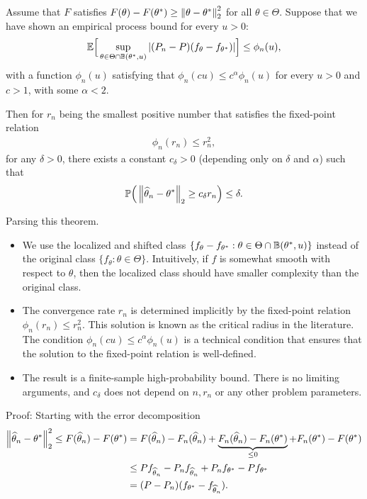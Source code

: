 \documentclass[11pt,letterpaper]{article}
\numberwithin{theorem}{lecture}
\numberwithin{proposition}{lecture}
\numberwithin{lemma}{lecture}
\numberwithin{claim}{lecture}
\numberwithin{corollary}{lecture}
\numberwithin{definition}{lecture}
\numberwithin{conjecture}{lecture}
\numberwithin{remark}{lecture}
\numberwithin{example}{lecture}
\numberwithin{equation}{lecture}
\begin{document}
\begin{theorem}[Localization]
  Assume that $F$ satisfies $F(\theta) - F ({\theta^*}) \geq \left\| \theta - {\theta^*}\right\|_{2}^2$ for all $\theta \in \Theta$. Suppose that we have shown an empirical process bound for every $u > 0$:
  \begin{align}
    {\mathbb{E}} \Big[ \sup_{\theta \in \Theta \cap \mathbb{B} ({\theta^*}, u)} |(P_n - P) (f_\theta - f_{{\theta^*}})| \Big] \leq \phi_n (u),
  \end{align}
  with a function $\phi_n (u)$ satisfying that $\phi_n (c u) \leq c^\alpha \phi_n (u)$ for every $u > 0$ and $c > 1$, with some $\alpha < 2$.

  Then for $r_n$ being the smallest positive number that satisfies the fixed-point relation
  \begin{align}
    \phi_n (r_n) \leq r_n^2,
  \end{align}
  for any $\delta > 0$, there exists a constant $c_\delta > 0$ (depending only on $\delta$ and $\alpha$) such that
  \begin{align}
    {\mathbb{P}} \Big( \left\| \widehat{\theta}_n - {\theta^*}\right\|_{2} \geq c_\delta r_n \Big) \leq \delta.
  \end{align}
\end{theorem}
Parsing this theorem.
\begin{itemize}
  \item We use the localized and shifted class $\{f_\theta - f_{{\theta^*}}: \theta \in \Theta \cap \mathbb{B} ({\theta^*}, u)\}$ instead of the original class $\{f_\theta: \theta \in \Theta\}$. Intuitively, if $f$ is somewhat smooth with respect to $\theta$, then the localized class should have smaller complexity than the original class.
  \item The convergence rate $r_n$ is determined implicitly by the fixed-point relation $\phi_n (r_n) \leq r_n^2$. This solution is known as the critical radius in the literature. The condition $\phi_n (c u) \leq c^\alpha \phi_n (u)$ is a technical condition that ensures that the solution to the fixed-point relation is well-defined.
  \item The result is a finite-sample high-probability bound. There is no limiting arguments, and $c_\delta$ does not depend on $n, r_n$ or any other problem parameters.
\end{itemize}
Proof: Starting with the error decomposition
\begin{align*}
  \left\| \widehat{\theta}_n - {\theta^*}\right\|_{2}^2 \leq F (\widehat{\theta}_n) - F ({\theta^*}) &= F (\widehat{\theta}_n) - F_n (\widehat{\theta}_n) + \underbrace{F_n (\widehat{\theta}_n) - F_n ({\theta^*})}_{ \leq 0} + F_n ({\theta^*}) - F ({\theta^*})\\
  & \leq P f_{\widehat{\theta}_n} - P_n f_{\widehat{\theta}_n} + P_n f_{{\theta^*}} - P f_{{\theta^*}} \\
  &= (P - P_n) (f_{{\theta^*}} - f_{\widehat{\theta}_n}).
\end{align*}
\end{document}
